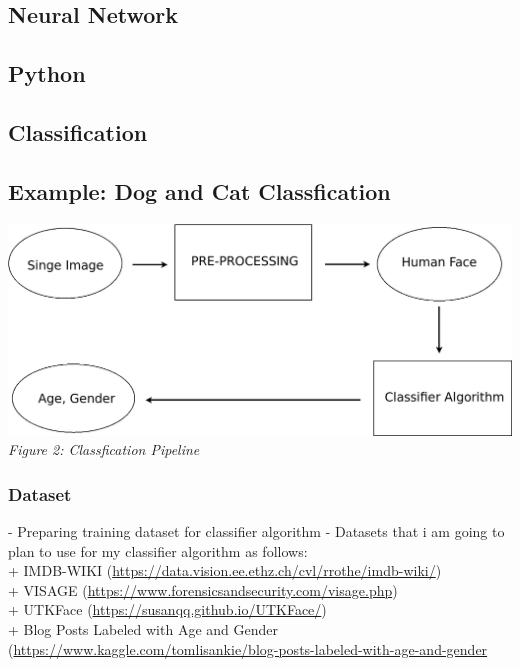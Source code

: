 \newpage
\subsection{Neural Network}
\subsection{Python}
\subsection{Classification}
\subsection{Example: Dog and Cat Classfication}

\begin{center}
\includegraphics[scale=0.25]{nn_diagram} \\
\textit{Figure 2: Classfication Pipeline}
\end{center}

\subsubsection{Dataset}
- Preparing training dataset for classifier algorithm
- Datasets that i am going to plan to use for my classifier algorithm as follows: \\
 + IMDB-WIKI (\url{https://data.vision.ee.ethz.ch/cvl/rrothe/imdb-wiki/}) \\
 + VISAGE (\url{https://www.forensicsandsecurity.com/visage.php}) \\
 + UTKFace (\url{https://susanqq.github.io/UTKFace/}) \\
 + Blog Posts Labeled with Age and Gender (\url{https://www.kaggle.com/tomlisankie/blog-posts-labeled-with-age-and-gender}
